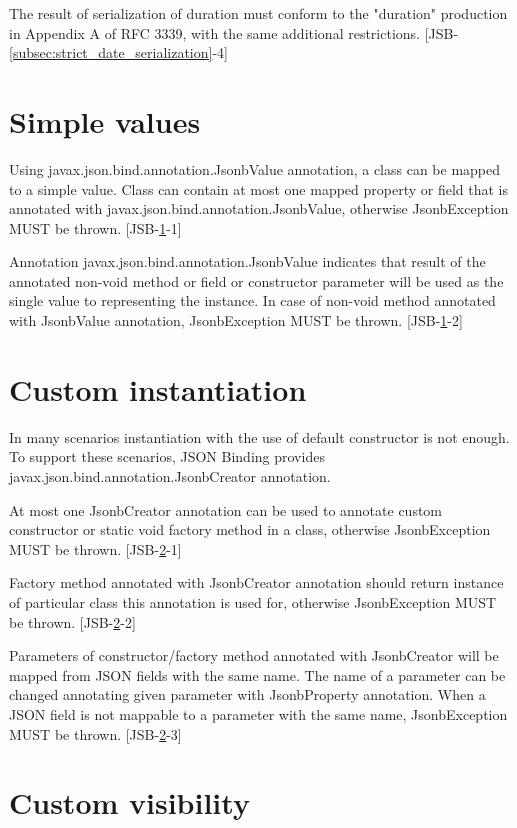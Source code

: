 The result of serialization of duration must conform to the "duration" production in Appendix A of RFC 3339, with the same additional restrictions. [JSB-\ref{subsec:strict_date_serialization}-4]

\section{Simple values}
\label{sec:simple_values}

Using javax.json.bind.annotation.JsonbValue annotation, a class can be mapped to a simple value. Class can contain at most one mapped property or field that is annotated with javax.json.bind.annotation.JsonbValue, otherwise JsonbException MUST be thrown.
[JSB-\ref{sec:simple_values}-1]

Annotation javax.json.bind.annotation.JsonbValue indicates that result of the annotated non-void method or field or constructor parameter will be used as the single value to representing the instance. In case of non-void method annotated with JsonbValue annotation, JsonbException MUST be thrown.
[JSB-\ref{sec:simple_values}-2]

\section{Custom instantiation}
\label{sec:custom_instantiation}

In many scenarios instantiation with the use of default constructor is not enough. To support these scenarios, JSON Binding provides javax.json.bind.annotation.JsonbCreator annotation.

At most one JsonbCreator annotation can be used to annotate custom constructor or static void factory method in a class, otherwise JsonbException MUST be thrown. [JSB-\ref{sec:custom_instantiation}-1]

Factory method annotated with JsonbCreator annotation should return instance of particular class this annotation is used for, otherwise JsonbException MUST be thrown. [JSB-\ref{sec:custom_instantiation}-2]

Parameters of constructor/factory method annotated with JsonbCreator will be mapped from JSON fields with the same name. The name of a parameter can be changed annotating given parameter with JsonbProperty annotation. When a JSON field is not mappable to a parameter with the same name, JsonbException MUST be thrown. [JSB-\ref{sec:custom_instantiation}-3]

\section{Custom visibility}
\label{sec:custom_visibility}

